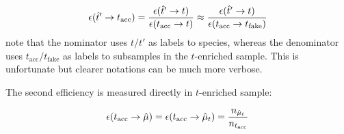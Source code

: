 \begin{equation}
    \misEff[\hat{t}']{t_\text{acc}} =
    \frac{
        \misEff[\hat{t}']{t}
    }{
        \misEff[t_\text{acc}]{t}
    } \approx
    \frac{
        \misEff[\hat{t}']{t}
    }{
        \misEff[t_\text{acc}]{t_\text{fake}}
    }
\end{equation}
note that the nominator uses $t/t'$ as labels to species, whereas the
denominator uses $t_\text{acc}/t_\text{fake}$ as labels to subsamples
in the $t$-enriched \pidcalib sample.
This is unfortunate but clearer notations can be much more verbose.

The second efficiency  is measured directly
in $t$-enriched \pidcalib sample:

\begin{equation}
    \misEff[t_\text{acc}]{\hat{\mu}} =
        \misEff[t_\text{acc}]{\hat{\mu}_t} =
        \frac{n_{\hat{\mu}_t}}{n_{t_\text{acc}}}
\end{equation}
